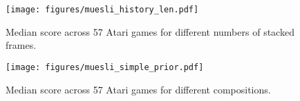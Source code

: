 \documentclass{article}
\begin{document}
\begin{figure}[t]
\begin{center}
\centerline{\texttt{[image: figures/muesli\_history\_len.pdf]}}
\caption{Median score across 57 Atari games for different numbers of stacked frames.}
\label{fig:muesli_history_len}
\end{center}
\vskip -0.2in
\end{figure}

\begin{figure}[t]
\begin{center}
\centerline{\texttt{[image: figures/muesli\_simple\_prior.pdf]}}
\caption{Median score across 57 Atari games for different  compositions.}
\label{fig:muesli_simple_prior}
\end{center}
\vskip -0.2in
\end{figure}
\end{document}
